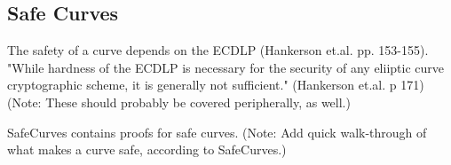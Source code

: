 \subsection{Safe Curves}

The safety of a curve depends on the ECDLP (Hankerson et.al. pp. 153-155). "While hardness of the ECDLP is necessary
for the security of any eliiptic curve cryptographic scheme, it is generally not sufficient." (Hankerson et.al. p 171)
(Note: These should probably be covered peripherally, as well.)

SafeCurves contains proofs for safe curves. (Note: Add quick walk-through of what makes a curve safe, according
to SafeCurves.)